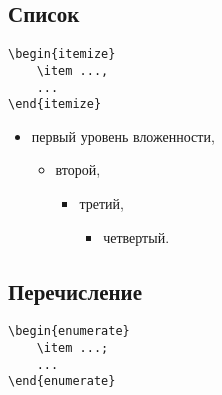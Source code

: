 \documentclass[14pt, a4paper, titlepage]{extarticle}
\begin{document}
\subsection{Список}

\begin{verbatim}
\begin{itemize}
    \item ...,
    ...
\end{itemize}
\end{verbatim}

\begin{itemize}
    \item первый уровень вложенности,
    \begin{itemize}
        \item второй,
        \begin{itemize}
            \item третий,
            \begin{itemize}
                \item четвертый.
            \end{itemize}
        \end{itemize}
    \end{itemize}
\end{itemize}

\subsection{Перечисление}

\begin{verbatim}
\begin{enumerate}
    \item ...;
    ...
\end{enumerate} 
\end{verbatim}
\end{document}
